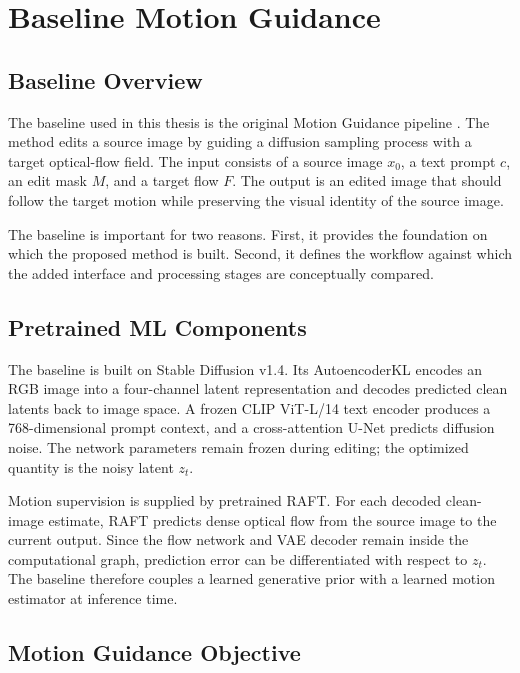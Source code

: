 \setlength{\footskip}{8mm}

\chapter{Baseline Motion Guidance}
\label{ch:baseline}

\section{Baseline Overview}

The baseline used in this thesis is the original Motion Guidance pipeline \cite{geng2024motionguidance}. The method edits a source image by guiding a diffusion sampling process with a target optical-flow field. The input consists of a source image $x_0$, a text prompt $c$, an edit mask $M$, and a target flow $F$. The output is an edited image that should follow the target motion while preserving the visual identity of the source image.

The baseline is important for two reasons. First, it provides the foundation on which the proposed method is built. Second, it defines the workflow against which the added interface and processing stages are conceptually compared.

\section{Pretrained ML Components}

The baseline is built on Stable Diffusion v1.4. Its AutoencoderKL encodes an RGB image into a four-channel latent representation and decodes predicted clean latents back to image space. A frozen CLIP ViT-L/14 text encoder produces a 768-dimensional prompt context, and a cross-attention U-Net predicts diffusion noise. The network parameters remain frozen during editing; the optimized quantity is the noisy latent $z_t$.

Motion supervision is supplied by pretrained RAFT. For each decoded clean-image estimate, RAFT predicts dense optical flow from the source image to the current output. Since the flow network and VAE decoder remain inside the computational graph, prediction error can be differentiated with respect to $z_t$. The baseline therefore couples a learned generative prior with a learned motion estimator at inference time.

\section{Motion Guidance Objective}

